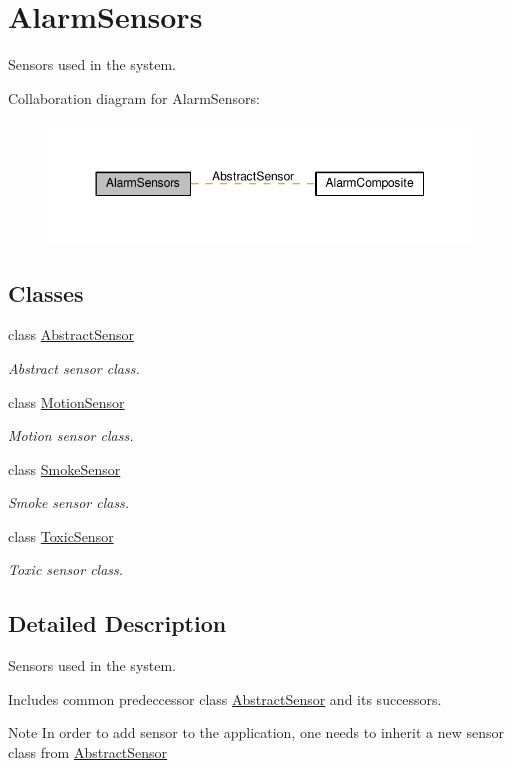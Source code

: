 \hypertarget{group__AlarmSensors}{}\section{Alarm\+Sensors}
\label{group__AlarmSensors}


Sensors used in the system.  


Collaboration diagram for Alarm\+Sensors\+:
\nopagebreak
\begin{figure}[H]
\begin{center}
\leavevmode
\includegraphics[width=350pt]{group__AlarmSensors}
\end{center}
\end{figure}
\subsection*{Classes}
\begin{DoxyCompactItemize}
\item 
class \hyperlink{classAbstractSensor}{Abstract\+Sensor}
\begin{DoxyCompactList}\small\item\em Abstract sensor class. \end{DoxyCompactList}\item 
class \hyperlink{classMotionSensor}{Motion\+Sensor}
\begin{DoxyCompactList}\small\item\em Motion sensor class. \end{DoxyCompactList}\item 
class \hyperlink{classSmokeSensor}{Smoke\+Sensor}
\begin{DoxyCompactList}\small\item\em Smoke sensor class. \end{DoxyCompactList}\item 
class \hyperlink{classToxicSensor}{Toxic\+Sensor}
\begin{DoxyCompactList}\small\item\em Toxic sensor class. \end{DoxyCompactList}\end{DoxyCompactItemize}


\subsection{Detailed Description}
Sensors used in the system. 

Includes common predeccessor class \hyperlink{classAbstractSensor}{Abstract\+Sensor} and its successors.

\begin{DoxyNote}{Note}
In order to add sensor to the application, one needs to inherit a new sensor class from \hyperlink{classAbstractSensor}{Abstract\+Sensor} 
\end{DoxyNote}
